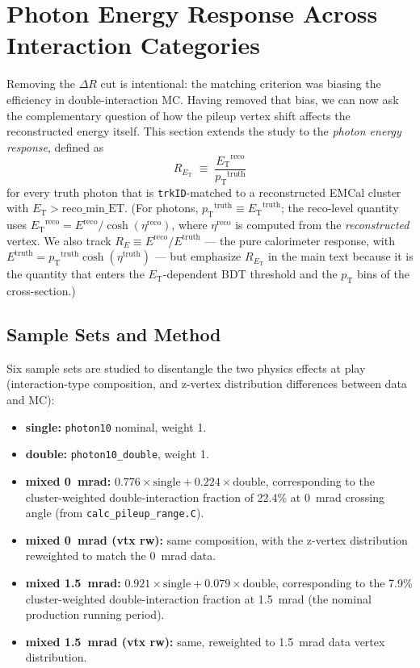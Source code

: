\documentclass[11pt,letterpaper]{article}
\newcommand{\DR}{\ensuremath{\Delta R}}
\newcommand{\pT}{\ensuremath{p_{\text{T}}}}
\newcommand{\ET}{\ensuremath{E_{\text{T}}}}
\begin{document}
\section{Photon Energy Response Across Interaction Categories}
\label{sec:response}

Removing the $\DR$ cut is intentional: the matching criterion was biasing the
efficiency in double-interaction MC. Having removed that bias, we can now ask
the complementary question of how the pileup vertex shift affects the
reconstructed energy itself. This section extends the study to the
\emph{photon energy response}, defined as
\begin{equation}
  R_{\ET} \;\equiv\; \frac{\ET^{\text{reco}}}{\pT^{\text{truth}}}
  \label{eq:respET}
\end{equation}
for every truth photon that is \texttt{trkID}-matched to a reconstructed EMCal
cluster with $\ET > \text{reco\_min\_ET}$. (For photons, $\pT^{\text{truth}}
\equiv \ET^{\text{truth}}$; the reco-level quantity uses
$\ET^{\text{reco}} = E^{\text{reco}} / \cosh(\eta^{\text{reco}})$, where
$\eta^{\text{reco}}$ is computed from the \emph{reconstructed} vertex. We also
track $R_E \equiv E^{\text{reco}} / E^{\text{truth}}$ — the pure calorimeter
response, with $E^{\text{truth}} = \pT^{\text{truth}} \cosh(\eta^{\text{truth}})$
— but emphasize $R_{\ET}$ in the main text because it is the quantity that
enters the \ET-dependent BDT threshold and the \pT{} bins of the
cross-section.)

\subsection{Sample Sets and Method}
\label{sec:resp_method}

Six sample sets are studied to disentangle the two physics effects at play
(interaction-type composition, and z-vertex distribution differences between
data and MC):

\begin{itemize}
  \item \textbf{single:} \texttt{photon10} nominal, weight 1.
  \item \textbf{double:} \texttt{photon10\_double}, weight 1.
  \item \textbf{mixed 0~mrad:} $0.776 \times \text{single} + 0.224 \times
    \text{double}$, corresponding to the cluster-weighted double-interaction
    fraction of 22.4\% at 0~mrad crossing angle (from
    \texttt{calc\_pileup\_range.C}).
  \item \textbf{mixed 0~mrad (vtx rw):} same composition, with the z-vertex
    distribution reweighted to match the 0~mrad data.
  \item \textbf{mixed 1.5~mrad:} $0.921 \times \text{single} + 0.079 \times
    \text{double}$, corresponding to the 7.9\% cluster-weighted
    double-interaction fraction at 1.5~mrad (the nominal production running
    period).
  \item \textbf{mixed 1.5~mrad (vtx rw):} same, reweighted to 1.5~mrad data
    vertex distribution.
\end{itemize}
\end{document}
